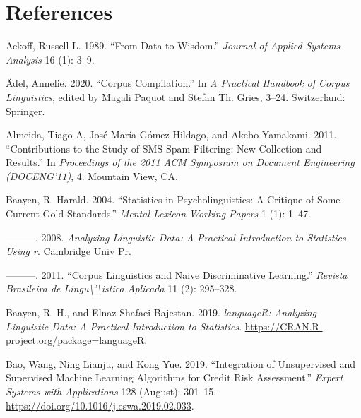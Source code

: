 \documentclass[
  letterpaper,
]{scrbook}
\newlength{\cslhangindent}
\newlength{\cslentryspacingunit} %
\newenvironment{CSLReferences}[2] %
 {%
  \setlength{\parindent}{0pt}
  \ifodd #1
  \let\oldpar\par
  \def\par{\hangindent=\cslhangindent\oldpar}
  \fi
  \setlength{\parskip}{#2\cslentryspacingunit}
 }%
 {}
\begin{document}

\hypertarget{references}{%
\chapter*{References}\label{references}}


\hypertarget{refs}{}
\begin{CSLReferences}{1}{0}
\leavevmode{}%
Ackoff, Russell L. 1989. {``From Data to Wisdom.''} \emph{Journal of
Applied Systems Analysis} 16 (1): 3--9.

\leavevmode{}%
Ädel, Annelie. 2020. {``Corpus Compilation.''} In \emph{A Practical
Handbook of Corpus Linguistics}, edited by Magali Paquot and Stefan Th.
Gries, 3--24. Switzerland: Springer.

\leavevmode{}%
Almeida, Tiago A, José María Gómez Hildago, and Akebo Yamakami. 2011.
{``Contributions to the Study of SMS Spam Filtering: New Collection and
Results.''} In \emph{Proceedings of the 2011 ACM Symposium on Document
Engineering (DOCENG'11)}, 4. Mountain View, CA.

\leavevmode{}%
Baayen, R. Harald. 2004. {``Statistics in Psycholinguistics: A Critique
of Some Current Gold Standards.''} \emph{Mental Lexicon Working Papers}
1 (1): 1--47.

\leavevmode{}%
---------. 2008. \emph{Analyzing Linguistic Data: A Practical
Introduction to Statistics Using r}. Cambridge Univ Pr.

\leavevmode{}%
---------. 2011. {``Corpus Linguistics and Naive Discriminative
Learning.''} \emph{Revista Brasileira de
Lingu\textbackslash'\textbackslash istica Aplicada} 11 (2): 295--328.

\leavevmode{}%
Baayen, R. H., and Elnaz Shafaei-Bajestan. 2019. \emph{languageR:
Analyzing Linguistic Data: A Practical Introduction to Statistics}.
\url{https://CRAN.R-project.org/package=languageR}.

\leavevmode{}%
Bao, Wang, Ning Lianju, and Kong Yue. 2019. {``Integration of
Unsupervised and Supervised Machine Learning Algorithms for Credit Risk
Assessment.''} \emph{Expert Systems with Applications} 128 (August):
301--15. \url{https://doi.org/10.1016/j.eswa.2019.02.033}.


\end{CSLReferences}
\end{document}
